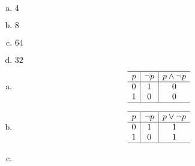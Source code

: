 {{        %
        \begin{practices}
            \begin{enumerate}[a)]
                \item $4$
                \item $8$
                \item $64$
                \item $32$
            \end{enumerate}
        \end{practices}
        
        \begin{practices}
            \begin{enumerate}[a)]
                \item 
                {
                    \begin{table}[H]
                        \[
                            \begin{array}{c|c|c}
                                \hline
                                p & \neg p & p \wedge \neg p \\
                                \hline
                                0 & 1 & 0 \\
                                1 & 0 & 0 \\
                                \hline
                            \end{array}
                        \]
                    \end{table}
                }
                \item
                {
                    \begin{table}[H]
                        \[
                            \begin{array}{c|c|c}
                                \hline
                                p & \neg p & p \vee \neg p \\
                                \hline
                                0 & 1 & 1 \\
                                1 & 0 & 1 \\
                                \hline
                            \end{array}
                        \]
                    \end{table}
                }
                \item
                {
                    \begin{table}[H]

\end{table}}
\end{enumerate}
\end{practices}}}
